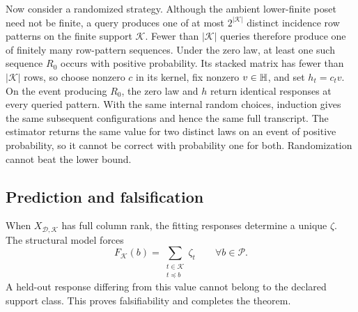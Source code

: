 Now consider a randomized strategy.  Although the ambient lower-finite poset
need not be finite, a query produces one of at most $2^{|\mathcal K|}$
distinct incidence row patterns on the finite support $\mathcal K$.  Fewer
than $|\mathcal K|$ queries therefore produce one of finitely many row-pattern
sequences.  Under the zero law, at least one such sequence $R_0$ occurs with
positive probability.  Its stacked matrix has fewer than $|\mathcal K|$
rows, so choose nonzero $c$ in its kernel, fix nonzero $v\in\mathbb H$, and set
$h_t=c_tv$.  On the event producing $R_0$, the zero law and $h$ return
identical responses at every queried pattern.  With
the same internal random choices, induction gives the same subsequent
configurations and hence the same full transcript.  The estimator returns
the same value for two distinct laws on an event of positive probability, so
it cannot be correct with probability one for both.  Randomization cannot
beat the lower bound.

\subsection{Prediction and falsification}

When $X_{\mathcal D,\mathcal K}$ has full column rank, the fitting responses
determine a unique $\zeta$.  The structural model forces
\[
F_{\mathcal K}(b)
=\sum_{\substack{t\in\mathcal K\\t\preceq b}}\zeta_t
\qquad\forall b\in\mathcal P.
\]
A held-out response differing from this value cannot belong to the declared
support class.  This proves falsifiability and completes the theorem.
